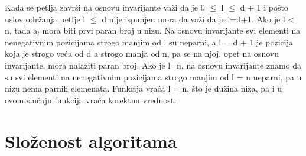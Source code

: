 \documentclass{article}
\begin{document}
\newline \hspace*{0.8cm}Kada se petlja završi na osnovu invarijante važi da je 0 $\leq$ l $\leq$ d + 1 i \hspace*{0.8cm}pošto uslov održanja 	petlje l $\leq$ d nije ispunjen mora da važi da je l=d+1. \hspace*{0.8cm}Ako je l < n, tada a$_l$ mora biti prvi paran 	broj u nizu. Na osnovu invarijante \newline \hspace*{0.8cm}svi elementi na nenegativnim pozicijama strogo manjim 	od l su neparni, \hspace*{0.8cm}a l = d + 1 je pozicija koja je strogo veća od d a strogo manja od n, pa \hspace*{0.8cm}se na njoj, opet na osnovu invarijante, mora nalaziti paran broj. Ako je \hspace*{0.8cm}l=n, na osnovu invarijante znamo da su svi elementi na nenegativnim \newline pozicijama strogo manjim od l = n neparni, pa u 	nizu nema parnih elemenata. Funkcija vraća l = n, što je dužina niza, pa i u ovom slučaju 	funkcija vraća korektnu vrednost.

\newpage

\section{Složenost algoritama}
\end{document}
